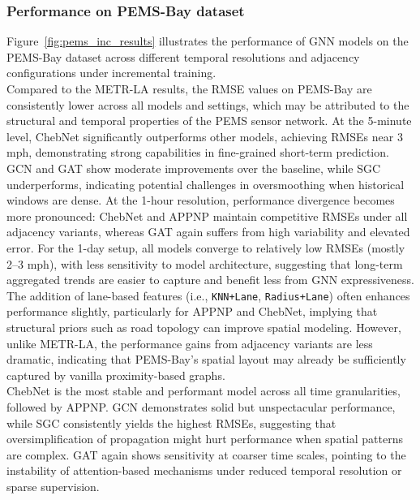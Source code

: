 \documentclass[runningheads]{llncs}
\begin{document}
\subsubsection*{Performance on PEMS-Bay dataset}
Figure~\ref{fig:pems_inc_results} illustrates the performance of GNN models on the PEMS-Bay dataset across different temporal resolutions and adjacency configurations under incremental training.\\
Compared to the METR-LA results, the RMSE values on PEMS-Bay are consistently lower across all models and settings, which may be attributed to the structural and temporal properties of the PEMS sensor network. At the 5-minute level, ChebNet significantly outperforms other models, achieving RMSEs near 3 mph, demonstrating strong capabilities in fine-grained short-term prediction. GCN and GAT show moderate improvements over the baseline, while SGC underperforms, indicating potential challenges in oversmoothing when historical windows are dense. At the 1-hour resolution, performance divergence becomes more pronounced: ChebNet and APPNP maintain competitive RMSEs under all adjacency variants, whereas GAT again suffers from high variability and elevated error. For the 1-day setup, all models converge to relatively low RMSEs (mostly 2–3 mph), with less sensitivity to model architecture, suggesting that long-term aggregated trends are easier to capture and benefit less from GNN expressiveness.\\
The addition of lane-based features (i.e., \texttt{KNN+Lane}, \texttt{Radius+Lane}) often enhances performance slightly, particularly for APPNP and ChebNet, implying that structural priors such as road topology can improve spatial modeling. However, unlike METR-LA, the performance gains from adjacency variants are less dramatic, indicating that PEMS-Bay's spatial layout may already be sufficiently captured by vanilla proximity-based graphs.\\
ChebNet is the most stable and performant model across all time granularities, followed by APPNP. GCN demonstrates solid but unspectacular performance, while SGC consistently yields the highest RMSEs, suggesting that oversimplification of propagation might hurt performance when spatial patterns are complex. GAT again shows sensitivity at coarser time scales, pointing to the instability of attention-based mechanisms under reduced temporal resolution or sparse supervision.
\end{document}
